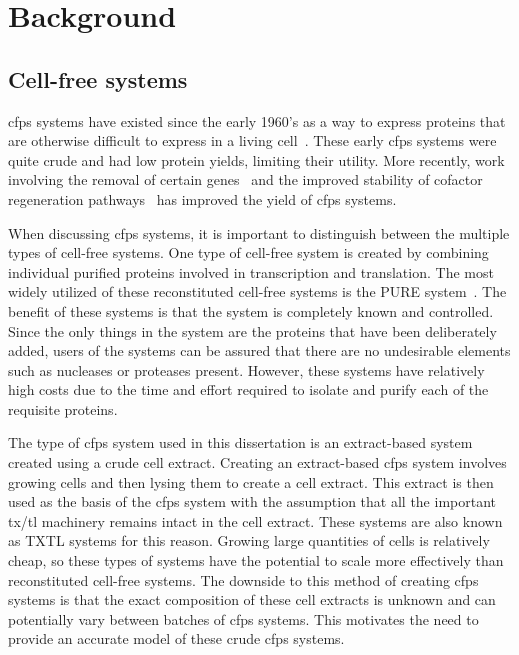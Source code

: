 \chapter{Background}\label{chap:bkg}

\section{Cell-free systems}
\gls{cfps} systems have existed since the early 1960's as a way to express proteins that are otherwise difficult to express in a living cell~\cite{nirenberg1961dependence}.
These early \gls{cfps} systems were quite crude and had low protein yields, limiting their utility.
More recently, work involving the removal of certain genes~\cite{calhoun2006total} and the improved stability of cofactor regeneration pathways~\cite{jewett2008integrated} has improved the yield of \gls{cfps} systems.

When discussing \gls{cfps} systems, it is important to distinguish between the multiple types of cell-free systems.
One type of cell-free system is created by combining individual purified proteins involved in transcription and translation.
The most widely utilized of these reconstituted cell-free systems is the PURE system~\cite{shimizu2001cell}.
The benefit of these systems is that the system is completely known and controlled.
Since the only things in the system are the proteins that have been deliberately added, users of the systems can be assured that there are no undesirable elements such as nucleases or proteases present.
However, these systems have relatively high costs due to the time and effort required to isolate and purify each of the requisite proteins.

The type of \gls{cfps} system used in this dissertation is an extract-based system created using a crude cell extract.
Creating an extract-based \gls{cfps} system involves growing cells and then lysing them to create a cell extract.
This extract is then used as the basis of the \gls{cfps} system with the assumption that all the important \gls{tx}/\gls{tl} machinery remains intact in the cell extract.
These systems are also known as TXTL systems for this reason.
Growing large quantities of cells is relatively cheap, so these types of systems have the potential to scale more effectively than reconstituted cell-free systems. 
The downside to this method of creating \gls{cfps} systems is that the exact composition of these cell extracts is unknown and can potentially vary between batches of \gls{cfps} systems.
This motivates the need to provide an accurate model of these crude \gls{cfps} systems.

